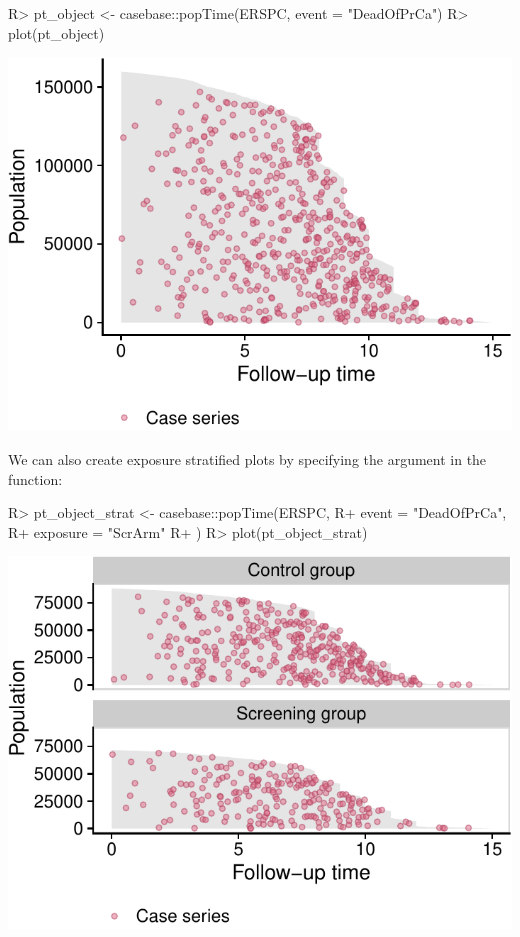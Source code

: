 \documentclass[
]{jss}
\begin{document}
\begin{CodeChunk}

\begin{CodeInput}
R> pt_object <- casebase::popTime(ERSPC, event = "DeadOfPrCa")
R> plot(pt_object)
\end{CodeInput}


\begin{center}\includegraphics{../figures/plot-erspc-data-1} \end{center}

\end{CodeChunk}

We can also create exposure stratified plots by specifying the
 argument in the  function:

\begin{CodeChunk}

\begin{CodeInput}
R> pt_object_strat <- casebase::popTime(ERSPC,
R+   event = "DeadOfPrCa",
R+   exposure = "ScrArm"
R+ )
R> plot(pt_object_strat)
\end{CodeInput}


\begin{center}\includegraphics{../figures/plot-stratified-erspc-data-1} \end{center}

\end{CodeChunk}
\end{document}
